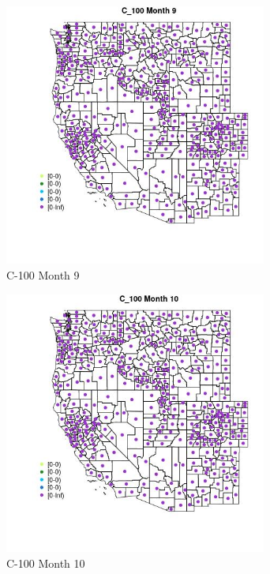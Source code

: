 \begin{figure} 
\centering  
\includegraphics[width=0.77\textwidth]{Code_Outputs/df_report_ML_predictors_CountyCentroid_Locations_Dates_2008-01-01to2018-12-31_MapObsMo9C_100.jpg} 
\caption{\label{fig:df_report_ML_predictors_CountyCentroid_Locations_Dates_2008-01-01to2018-12-31MapObsMo9C_100}C-100 Month 9} 
\end{figure} 
 

\clearpage 

\begin{figure} 
\centering  
\includegraphics[width=0.77\textwidth]{Code_Outputs/df_report_ML_predictors_CountyCentroid_Locations_Dates_2008-01-01to2018-12-31_MapObsMo10C_100.jpg} 
\caption{\label{fig:df_report_ML_predictors_CountyCentroid_Locations_Dates_2008-01-01to2018-12-31MapObsMo10C_100}C-100 Month 10} 
\end{figure} 
 

